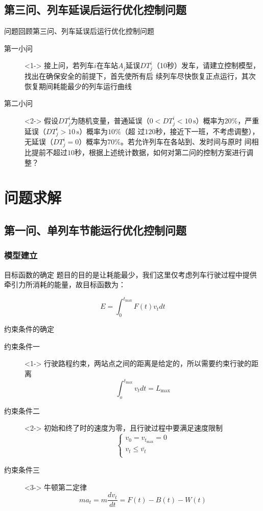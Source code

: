 \documentclass{beamer}
\begin{document}
\subsection{第三问、列车延误后运行优化控制问题}
\begin{frame}{问题回顾}{第三问、列车延误后运行优化控制问题}
\begin{description}
  \item[第一小问]<1-> 接上问，若列车$i$在车站$A_j$延误$DT_j^i$（10秒）发车，请建立控制模型，找出在确保安全的前提下，首先使所有后
续列车尽快恢复正点运行，其次恢复期间耗能最少的列车运行曲线
  \item[第二小问]<2-> 假设$DT_j^i$为随机变量，普通延误（$0<DT_j^i <10 \, \mathrm{s}$）概率为$20\%$，严重延误（$DT_j^i >10 \, \mathrm{s}$）概率为$10\%$（超
过$120$秒，接近下一班，不考虑调整），无延误（$DT_j^i= 0$）概率为$70\%$。若允许列车在各站到、发时间与原时
间相比提前不超过$10$秒，根据上述统计数据，如何对第二问的控制方案进行调整？
\end{description}
\end{frame}

\section{问题求解}
\subsection{第一问、单列车节能运行优化控制问题}
\subsubsection{模型建立}
\begin{frame}{目标函数的确定}
题目的目的是让耗能最少，我们这里仅考虑列车行驶过程中提供牵引力所消耗的能量，故目标函数为：

\[E = \int_0^{{t_{\max }}} {F\left( t \right){v_t}dt} \]

\end{frame}

\begin{frame}{约束条件的确定}
\begin{description}
  \item[约束条件一]<1-> 行驶路程约束，两站点之间的距离是给定的，所以需要约束行驶的距离
    \[\int_o^{{t_{\max }}} {{v_t}dt}  = {L_{\max }}\]
  \item[约束条件二]<2-> 初始和终了时的速度为零，且行驶过程中要满足速度限制
    \[\left\{ \begin{array}{l}
 {v_0} = {v_{{t_{\max }}}} = 0 \\
 {v_t} \le \overline {{v_t}}  \\
 \end{array} \right.\]
  \item[约束条件三]<3-> 牛顿第二定律
    \[m{a_t} = m\frac{{d{v_t}}}{{dt}} = F\left( t \right) - B\left( t \right) - W\left( t \right)\]
\end{description}

\end{frame}
\end{document}
